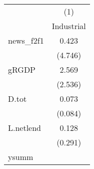 {
\def\sym#1{\ifmmode^{#1}\else\(^{#1}\)\fi}
\begin{tabular}{l*{1}{c}}
\toprule
            &\multicolumn{1}{c}{(1)}\\
            &\multicolumn{1}{c}{Industrial}\\
\midrule
news\_f2f1   &       0.423         \\
            &     (4.746)         \\
\addlinespace
gRGDP       &       2.569         \\
            &     (2.536)         \\
\addlinespace
D.tot       &       0.073         \\
            &     (0.084)         \\
\addlinespace
L.netlend   &       0.128         \\
            &     (0.291)         \\
\midrule
ysumm       &                     \\
\bottomrule
\end{tabular}
}
